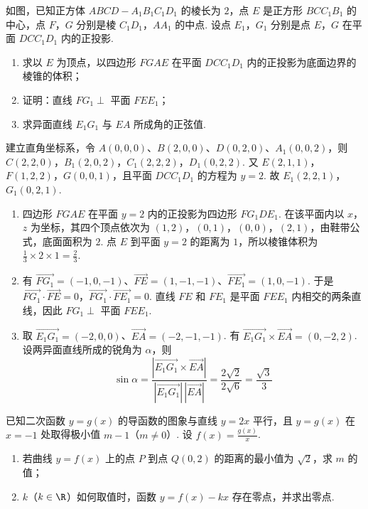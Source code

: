 \begin{problem}
如图，已知正方体 \(ABCD-A_1B_1C_1D_1\) 的棱长为 \(2\)，点 \(E\) 是正方形 \(BCC_1B_1\) 的中心，点 \(F\)，\(G\) 分别是棱 \(C_1D_1\)，\(AA_1\) 的中点. 设点 \(E_1\)，\(G_1\) 分别是点 \(E\)，\(G\) 在平面 \(DCC_1D_1\) 内的正投影.
\begin{enumerate}
\item 求以 \(E\) 为顶点，以四边形 \(FGAE\) 在平面 \(DCC_1D_1\) 内的正投影为底面边界的棱锥的体积；
\item 证明：直线 \(FG_1\perp\) 平面 \(FEE_1\)；
\item 求异面直线 \(E_1G_1\) 与 \(EA\) 所成角的正弦值.
\end{enumerate}

\end{problem}

\begin{solution}
建立直角坐标系，令 \(A(0,0,0)\)、\(B(2,0,0)\)、\(D(0,2,0)\)、\(A_1(0,0,2)\)，则
\(C(2,2,0)\)，\(B_1(2,0,2)\)，\(C_1(2,2,2)\)，\(D_1(0,2,2)\). 又 \(E(2,1,1)\)，\(F(1,2,2)\)，\(G(0,0,1)\)，且平面 \(DCC_1D_1\) 的方程为 \(y=2\). 故 \(E_1(2,2,1)\)，\(G_1(0,2,1)\).
\begin{enumerate}
\item 四边形 \(FGAE\) 在平面 \(y=2\) 内的正投影为四边形 \(FG_1DE_1\). 在该平面内以 \(x\)，\(z\) 为坐标，其四个顶点依次为 \((1,2)\)，\((0,1)\)，\((0,0)\)，\((2,1)\)，由鞋带公式，底面面积为 \(2\). 点 \(E\) 到平面 \(y=2\) 的距离为 \(1\)，所以棱锥体积为 \(\frac13\times2\times1=\frac23\).
\item 有 \(\overrightarrow{FG_1}=(-1,0,-1)\)、\(\overrightarrow{FE}=(1,-1,-1)\)、\(\overrightarrow{FE_1}=(1,0,-1)\). 于是
\(\overrightarrow{FG_1}\cdot\overrightarrow{FE}=0\)，\(\overrightarrow{FG_1}\cdot\overrightarrow{FE_1}=0\).
直线 \(FE\) 和 \(FE_1\) 是平面 \(FEE_1\) 内相交的两条直线，因此 \(FG_1\perp\) 平面 \(FEE_1\).
\item 取 \(\overrightarrow{E_1G_1}=(-2,0,0)\)、\(\overrightarrow{EA}=(-2,-1,-1)\). 有 \(\overrightarrow{E_1G_1}\times\overrightarrow{EA}=(0,-2,2)\). 设两异面直线所成的锐角为 \(\alpha\)，则
\[
\sin\alpha=\frac{|\overrightarrow{E_1G_1}\times\overrightarrow{EA}|}{|\overrightarrow{E_1G_1}|\,|\overrightarrow{EA}|}=\frac{2\sqrt2}{2\sqrt6}=\frac{\sqrt3}{3}
\]
\end{enumerate}
\end{solution}

\begin{problem}
已知二次函数 \(y = g(x)\) 的导函数的图象与直线 \(y = 2x\) 平行，且 \(y = g(x)\) 在 \(x = -1\) 处取得极小值 \(m - 1\)（\(m \neq 0\)）. 设 \(f(x) = \frac{g(x)}{x}\).
\begin{enumerate}
\item 若曲线 \(y = f(x)\) 上的点 \(P\) 到点 \(Q(0, 2)\) 的距离的最小值为 \(\sqrt{2}\)，求 \(m\) 的值；
\item \(k\)（\(k \in \R\)）如何取值时，函数 \(y = f(x) - kx\) 存在零点，并求出零点.
\end{enumerate}
\end{problem}


